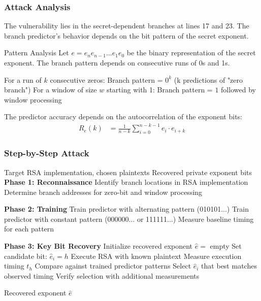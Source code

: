 \documentclass[11pt,a4paper]{article}
\theoremstyle{definition}
\begin{document}
\subsubsection{Attack Analysis}

The vulnerability lies in the secret-dependent branches at lines 17 and 23. The branch predictor's behavior depends on the bit pattern of the secret exponent.

\begin{mathematicsbox}{Pattern Analysis}
Let $e = e_n e_{n-1} \ldots e_1 e_0$ be the binary representation of the secret exponent. The branch pattern depends on consecutive runs of 0s and 1s.

For a run of $k$ consecutive zeros: Branch pattern = $0^k$ (k predictions of "zero branch")
For a window of size $w$ starting with 1: Branch pattern = $1$ followed by window processing

The predictor accuracy depends on the autocorrelation of the exponent bits:
\begin{align}
R_e(k) &= \frac{1}{n-k} \sum_{i=0}^{n-k-1} e_i \cdot e_{i+k}
\end{align}
\end{mathematicsbox}

\subsubsection{Step-by-Step Attack}

\begin{algorithm}
\caption{RSA Sliding Window Branch Prediction Attack}
\begin{algorithmic}[1]
\REQUIRE Target RSA implementation, chosen plaintexts
\ENSURE Recovered private exponent bits
\STATE \textbf{Phase 1: Reconnaissance}
\STATE Identify branch locations in RSA implementation
\STATE Determine branch addresses for zero-bit and window processing

\STATE \textbf{Phase 2: Training}
    \STATE Train predictor with alternating pattern (010101...)
    \STATE Train predictor with constant pattern (000000... or 111111...)
    \STATE Measure baseline timing for each pattern
\ENDFOR

\STATE \textbf{Phase 3: Key Bit Recovery}
\STATE Initialize recovered exponent $\hat{e} = $ empty
        \STATE Set candidate bit: $\hat{e}_i = h$
        \STATE Execute RSA with known plaintext
        \STATE Measure execution timing $t_h$
        \STATE Compare against trained predictor patterns
    \ENDFOR
    \STATE Select $\hat{e}_i$ that best matches observed timing
    \STATE Verify selection with additional measurements
\ENDFOR

\RETURN Recovered exponent $\hat{e}$
\end{algorithmic}
\end{algorithm}
\end{document}
